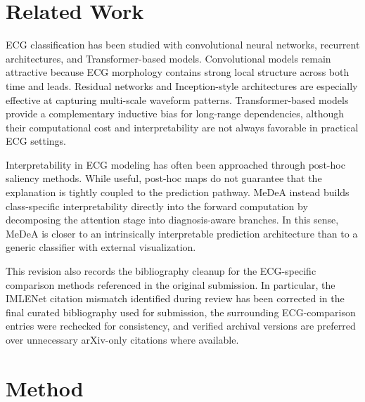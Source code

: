 \documentclass[11pt]{article}
\begin{document}
\section{Related Work}

ECG classification has been studied with convolutional neural networks, recurrent architectures, and Transformer-based models. Convolutional models remain attractive because ECG morphology contains strong local structure across both time and leads. Residual networks and Inception-style architectures are especially effective at capturing multi-scale waveform patterns. Transformer-based models provide a complementary inductive bias for long-range dependencies, although their computational cost and interpretability are not always favorable in practical ECG settings.

Interpretability in ECG modeling has often been approached through post-hoc saliency methods. While useful, post-hoc maps do not guarantee that the explanation is tightly coupled to the prediction pathway. MeDeA instead builds class-specific interpretability directly into the forward computation by decomposing the attention stage into diagnosis-aware branches. In this sense, MeDeA is closer to an intrinsically interpretable prediction architecture than to a generic classifier with external visualization.

This revision also records the bibliography cleanup for the ECG-specific comparison methods referenced in the original submission. In particular, the IMLENet citation mismatch identified during review has been corrected in the final curated bibliography used for submission, the surrounding ECG-comparison entries were rechecked for consistency, and verified archival versions are preferred over unnecessary arXiv-only citations where available.

\section{Method}
\end{document}
